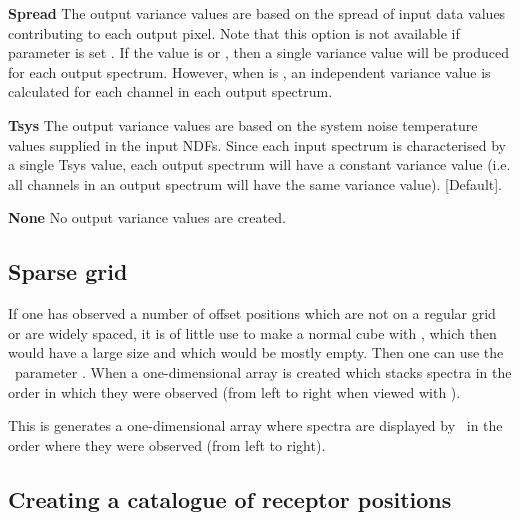 \documentclass[11pt,oneside,chapters]{starlink}
\begin{document}
\begin{center}
\begin{aligndesc}
\item[\textbf{Spread }]
The output variance values are based on the spread of input data
values contributing to each output pixel. Note that this option is not
available if parameter  is set . If the
 value is  or , then a single
variance value will be produced for each output spectrum. However,
when  is , an independent variance value is
calculated for each channel in each output spectrum.
\vspace{0.7cm}\\
\item[\textbf{Tsys }]
The output variance values are based on the system noise temperature
values supplied in the input NDFs. Since each input spectrum is
characterised by a single Tsys value, each output spectrum will have a
constant variance value (i.e. all channels in an output spectrum will
have the same variance value). [Default].
\vspace{0.7cm}\\
\item[\textbf{None }]
 No output variance values are created.\\
\end{aligndesc}
\end{center}

\subsection{Sparse grid}

If one has observed a number of offset positions which are not on a
regular grid or are widely spaced, it is of little use to make a
normal cube with \makecube, which then would have a large size and
which would be mostly empty. Then one can use the \makecube\ parameter
. When  a one-dimensional array is
created which stacks spectra in the order in which they were observed
(from left to right when viewed with \gaia).
\begin{terminalv}
\end{terminalv}
This is generates a one-dimensional array where spectra are displayed by
\gaia\ in the order where they were observed (from left to right).

\subsection{Creating a catalogue of receptor positions}
\end{document}
